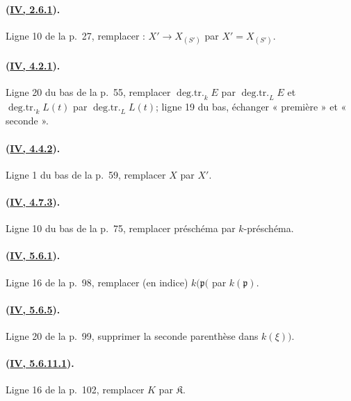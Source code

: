 \paragraph{({\texorpdfstring{\protect\hyperlink{ega4.c04.prop.2-6-1}{IV, 2.6.1}}{IV, 2.6.1}}).}
Ligne 10 de la p.~27, remplacer : $X'\to X_{(S')}$ par
$X'=X_{(S')}$. 

\paragraph{({\texorpdfstring{\protect\hyperlink{ega4.c04.prop.4-2-1}{IV, 4.2.1}}{IV, 4.2.1}}).}
Ligne 20 du bas de la p.~55, remplacer
$\operatorname{deg.tr.}_kE$ par $\operatorname{deg.tr.}_LE$ et
$\operatorname{deg.tr.}_kL(t)$ par $\operatorname{deg.tr.}_LL(t)$;
ligne 19 du bas, échanger « première » et « seconde ».

\paragraph{({\texorpdfstring{\protect\hyperlink{ega4.c04.lem.4-4-2}{IV, 4.4.2}}{IV, 4.4.2}}).}
Ligne 1 du bas de la p.~59, remplacer $X$ par $X'$.

\paragraph{({\texorpdfstring{\protect\hyperlink{ega4.c04.prop.4-7-3}{IV, 4.7.3}}{IV, 4.7.3}}).}
Ligne 10 du bas de la p.~75, remplacer préschéma par $k$-préschéma.

\paragraph{({\texorpdfstring{\protect\hyperlink{ega4.c04.prop.5-6-1}{IV, 5.6.1}}{IV, 5.6.1}}).}
Ligne 16 de la p.~98, remplacer (en indice) $k(\mathfrak p($ par
$k(\mathfrak p)$.

\paragraph{({\texorpdfstring{\protect\hyperlink{ega4.c04.prop.5-6-5}{IV, 5.6.5}}{IV, 5.6.5}}).}
Ligne 20 de la p.~99, supprimer la seconde parenthèse dans $k(\xi))$.

\paragraph{({\texorpdfstring{\protect\hyperlink{ega4.c04.lem.5-6-11-1}{IV, 5.6.11.1}}{IV, 5.6.11.1}}).}
Ligne 16 de la p.~102, remplacer $K$ par $\mathfrak K$.

